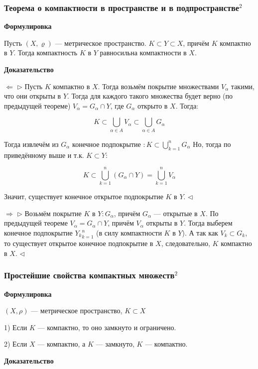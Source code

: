 \documentclass{article}
\begin{document}
\subsubsection{Теорема о компактности в пространстве и в подпространстве\texorpdfstring{$^2$}{}}

\textbf{Формулировка}

Пусть $(X, \varrho)$ --- метрическое пространство. $K \subset Y \subset X$, причём $K$ компактно в $Y$. Тогда компактность $K$ в $Y$
 равносильна компактности в $X$.
 
\textbf{Доказательство}

$\Leftarrow$ $\rhd$ Пусть $K$ компактно в $X$. Тогда возьмём покрытие множествами $V_\alpha$ такими, что они открыты в $Y$. Тогда для каждого такого множества будет верно (по предыдущей теореме) $V_\alpha = G_\alpha \cap Y$, где $G_\alpha$ открыто в $X$. Тогда:

\[K \subset \bigcup_{\alpha \in A} V_\alpha \subset \bigcup_{\alpha \in A} G_\alpha\]

Тогда извлечём из ${G_\alpha}$ конечное подпокрытие $: K \subset \bigcup_{k = 1}^n G_\alpha$ Но, тогда по приведённому выше и т.к. $K \subset Y$:

\[K \subset \bigcup_{k = 1}^n{(G_\alpha \cap Y)} = \bigcup_{k = 1}^n{V_\alpha} \]

Значит, существует конечное открытое подпокрытие $K$ в $Y$. $\lhd$

$\Rightarrow$ $\rhd$ Возьмём покрытие $K$ в $Y: {G_\alpha}$, причём $G_\alpha$ --- открытые в $X$. По предыдущей теореме $V_\alpha = G_\alpha \cap Y$, причём $V_\alpha$ открыты в $Y$. Тогда выберем конечное подпокрытие ${Y_k}_{k=1}^n$ (в силу компактности $K$ в $Y$). А так как $V_k \subset G_k$, то существует открытое конечное подпокрытие в $X$, следовательно, $K$ компактно в $X$. $\lhd$

\subsubsection{Простейшие свойства компактных множеств\texorpdfstring{$^2$}{}}

\textbf{Формулировка}

$(X, \rho)$ --- метрическое пространство, $K \subset X$

1) Если $K$ --- компактно, то оно замкнуто и ограничено.

2) Если $X$ --- компактно, а $K$ --- замкнуто, $K$ --- компактно.

\textbf{Доказательство}
\end{document}
